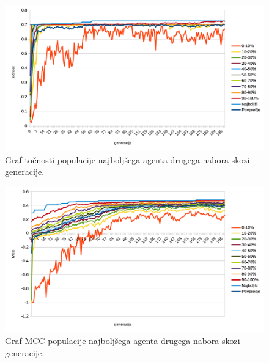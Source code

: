 \begin{figure}[H]
    \begin{center}
        \includegraphics[width=13cm]{car/2/acc}
    \end{center}
    \caption{Graf točnosti populacije najboljšega agenta drugega nabora skozi generacije.}
    \label{fig:car_acc_2}
\end{figure}

\begin{figure}[H]
    \begin{center}
        \includegraphics[width=13cm]{car/2/mcc}
    \end{center}
    \caption{Graf MCC populacije najboljšega agenta drugega nabora skozi generacije.}
    \label{fig:car_mcc_2}
\end{figure}

